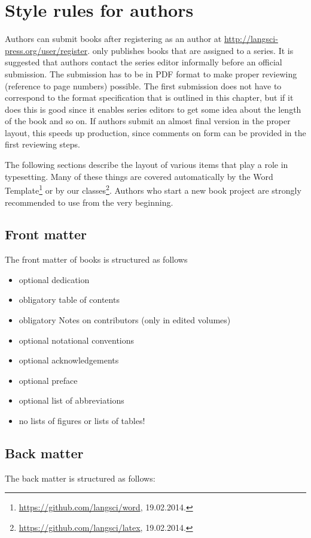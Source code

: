 \chapter{Style rules for authors}

Authors can submit books after registering as an author at
\url{http://langsci-press.org/user/register}. \lsp only publishes books that are assigned to a
series. It is suggested that authors contact the series editor informally before an official submission.
The submission has to be in PDF format to make proper
reviewing (reference to page numbers) possible. The first submission does not have to correspond to
the format specification that is outlined in this chapter, but if it does this is good since it
enables series editors to get some idea about the length of the book and so on. If authors submit an
almost final version in the proper layout, this speeds up production, since comments on form can be
provided in the first reviewing steps.


The following sections describe the layout of various items that play a role in typesetting. Many of
these things are covered automatically by the Word Template\footnote{
\url{https://github.com/langsci/word}, 19.02.2014.
} or by our \latex classes\footnote{
\url{https://github.com/langsci/latex}, 19.02.2014.
}. Authors who start a new book project are strongly recommended to use \latex from the very beginning.


\section{Front matter}
The front matter of \lsp books is structured as follows
\begin{itemize}
 \item optional dedication
 \item obligatory table of contents 
 \item obligatory Notes on contributors (only in edited volumes)
 \item optional notational conventions
 \item optional acknowledgements
 \item optional preface
 \item optional list of abbreviations
 \item no lists of figures or lists of tables!
\end{itemize}

\section{Back matter}
The back matter is structured as follows:

